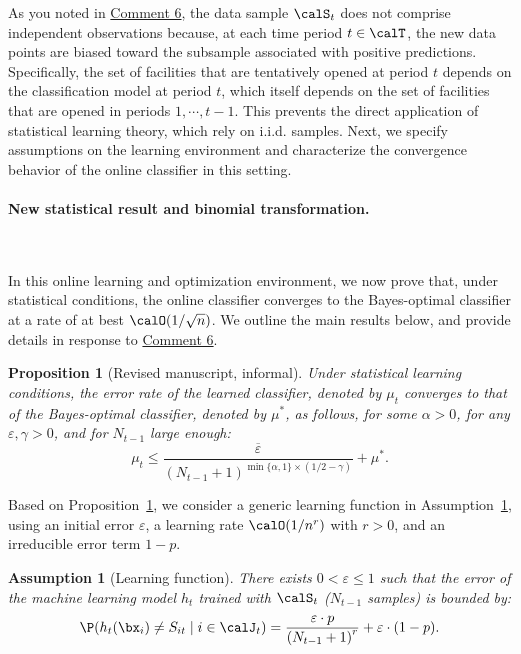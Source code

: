 \documentclass[11pt]{article}
\newtheorem{proposition}{Proposition}[]
\newtheorem{assumption}{Assumption}[]
\begin{document}
As you noted in \hyperref[R2:6]{\color{blue}Comment 6}, the data sample $\calS_t$ does not comprise independent observations because, at each time period $t\in\calT$, the new data points are biased toward the subsample associated with positive predictions. Specifically, the set of facilities that are tentatively opened at period $t$ depends on the classification model at period $t$, which itself depends on the set of facilities that are opened in periods $1,\cdots,t-1$. This prevents the direct application of statistical learning theory, which rely on i.i.d. samples. Next, we specify assumptions on the learning environment and characterize the convergence behavior of the online classifier in this setting.

\paragraph{New statistical result and binomial transformation.}\

In this online learning and optimization environment, we now prove that, under statistical conditions, the online classifier converges to the Bayes-optimal classifier at a rate of at best $\calO(1/\sqrt{n})$. We outline the main results below, and provide details in response to \hyperref[R2:6]{\color{blue}Comment 6}.
\setcounter{proposition}{0}
\begin{proposition}[Revised manuscript, informal]\label{prop:MLE_informal_R2_13}
       Under statistical learning conditions, the error rate of the learned classifier, denoted by $\mu_t$ converges to that of the Bayes-optimal classifier, denoted by $\mu^*$, as follows, for some $\alpha>0$, for any $\varepsilon,\gamma>0$, and for $N_{t-1}$ large enough:
        \[\mu_t \leq \frac{\overline\varepsilon}{(N_{t-1}+1)^{\min\{\alpha,1\}\times (1/2-\gamma)}}+\mu^*.\]
\end{proposition}

Based on Proposition~\ref{prop:MLE_informal_R2_13}, we consider a generic learning function in Assumption~\ref{ass:classification_R2_13}, using an initial error $\varepsilon$, a learning rate $\calO(1/n^r)$ with $r>0$, and an irreducible error term $1-p$.
\begin{assumption}[Learning function] \label{ass:classification_R2_13}
    There exists $0<\varepsilon\leq 1$ such that the error of the machine learning model $h_t$ trained with $\calS_t$ ($N_{t-1}$ samples) is bounded by:
    \begin{align*}
        \P(h_t(\bx_{i})\neq S_{it} \mid i \in \calJ_t)=\frac{\varepsilon\cdot p}{\left(N_{t-1} + 1\right)^r}+\varepsilon\cdot(1-p).
    \end{align*}
\end{assumption}
\end{document}
